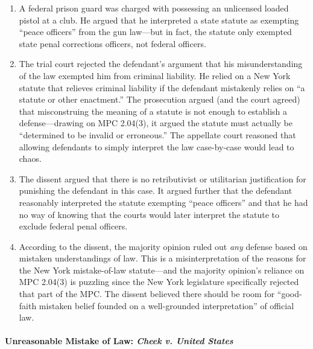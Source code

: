 \begin{enumerate}
    \item A federal prison guard was charged with possessing an unlicensed loaded pistol at a club. He argued that he interpreted a state statute as exempting ``peace officers'' from the gun law---but in fact, the statute only exempted state penal corrections officers, not federal officers.
    \item The trial court rejected the defendant's argument that his misunderstanding of the law exempted him from criminal liability. He relied on a New York statute that relieves criminal liability if the defendant mistakenly relies on ``a statute or other enactment.'' The prosecution argued (and the court agreed) that misconstruing the meaning of a statute is not enough to establish a defense---drawing on MPC 2.04(3), it argued the statute must actually be ``determined to be invalid or erroneous.'' The appellate court reasoned that allowing defendants to simply interpret the law case-by-case would lead to chaos.
    \item The dissent argued that there is no retributivist or utilitarian justification for punishing the defendant in this case. It argued further that the defendant reasonably interpreted the statute exempting ``peace officers'' and that he had no way of knowing that the courts would later interpret the statute to exclude federal penal officers.
    \item According to the dissent, the majority opinion ruled out \emph{any} defense based on mistaken understandings of law. This is a misinterpretation of the reasons for the New York mistake-of-law statute---and the majority opinion's reliance on MPC 2.04(3) is puzzling since the New York legislature specifically rejected that part of the MPC. The dissent believed there should be room for ``good-faith mistaken belief founded on a well-grounded interpretation'' of official law.
\end{enumerate}

\paragraph{Unreasonable Mistake of Law: \emph{Cheek v. United States}}

